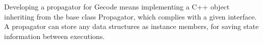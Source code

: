 \documentclass[a4paper,11pt]{article}
\numberwithin{equation}{section}
\begin{document}
Developing a propagator for Gecode means implementing a C++ object
inheriting from the base class Propagator,
which complies with a given interface.
A propagator can store any data structures as instance members,
for saving state information between executions.


    

\end{document}
